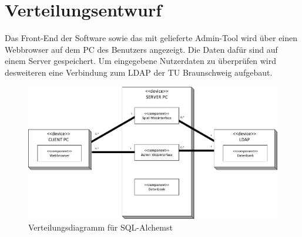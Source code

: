 
\chapter{Verteilungsentwurf}

Das Front-End der Software sowie das mit gelieferte Admin-Tool wird über einen Webbrowser auf dem PC des Benutzers angezeigt. Die Daten dafür sind auf einem Server gespeichert. Um eingegebene Nutzerdaten zu überprüfen wird desweiteren eine Verbindung zum LDAP der TU Braunschweig aufgebaut.

\begin{figure}[ht]
\centering
\includegraphics[width=1\textwidth]{figures/Verteilung1.pdf}
\caption{Verteilungsdiagramm für SQL-Alchemst}
\label{deployment}
\end{figure}
